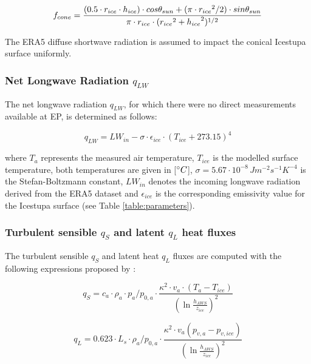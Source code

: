 \documentclass[utf8]{frontiersSCNS} %
\begin{document}
\begin{equation} \begin{split} f_{cone}& =\frac{(0.5 \cdot r_{ice} \cdot h_{ice}) \cdot cos \theta_{sun} +(\pi \cdot
{r_{ice}}^2/2) \cdot sin \theta_{sun} }{\pi \cdot r_{ice} \cdot ({r_{ice}}^2+{h_{ice}}^2)^{1/2}}\\ \end{split}
\label{eqn:f_{cone}} \end{equation}

The ERA5 diffuse shortwave radiation is assumed to impact the conical Icestupa surface uniformly. 

\subsubsection{Net Longwave Radiation \texorpdfstring{$q_{LW}$}{Lg}}

The net longwave radiation $q_{LW}$, for which there were no direct measurements available at EP, is
determined as follows:

\begin{equation} q_{LW}= LW_{in}-\sigma \cdot \epsilon_{ice} \cdot {(T_{ice}+ 273.15)}^4
\label{eqn:LW} \end{equation}

where $T_a$ represents the measured air temperature, $T_{ice}$ is the modelled surface temperature, both temperatures
are given in [$\degree C$], $\sigma=5.67\cdot 10^{-8}\,Jm^{-2}s^{-1}K^{-4}$ is the Stefan-Boltzmann constant, $LW_{in}$
denotes the incoming longwave radiation derived from the ERA5 dataset and $\epsilon_{ice}$ is the corresponding
emissivity value for the Icestupa surface (see Table \ref{table:parameters}).

\subsubsection{Turbulent sensible \texorpdfstring{$q_{S}$}{Lg} and latent \texorpdfstring{$q_{L}$}{Lg} heat fluxes }

The turbulent sensible $q_{S}$ and latent heat $q_{L}$ fluxes are computed with the following expressions proposed by
\cite{Garratt_1992}:

\begin{equation} q_{S}=c_{a} \cdot \rho_{a} \cdot p_{a}/p_{0,a} \cdot \frac{\kappa^2 \cdot v_a \cdot
(T_a-T_{ice})}{{(\ln{\frac{h_{AWS}}{z_{ice}}})}^2} \label{eqn:qs} \end{equation}

\begin{equation} q_{L}=0.623 \cdot L_s \cdot \rho_{a}/p_{0,a} \cdot \frac{\kappa^2 \cdot
v_a(p_{v,a}-p_{v,ice})}{{(\ln{\frac{h_{AWS}}{z_{ice}}})}^2} \end{equation}
\end{document}
